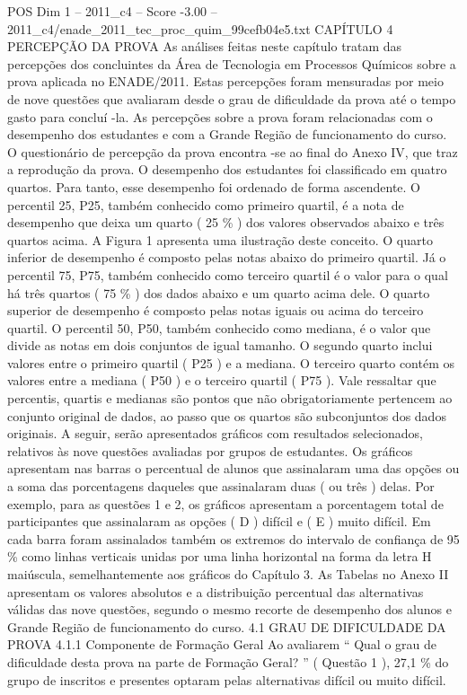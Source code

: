 \begin{textsample}{POS Dim 1 – 2011\_c4 – Score -3.00 – 2011\_c4/enade\_2011\_tec\_proc\_quim\_99cefb04e5.txt}  \label{ex:f1_pos_329}
CAPÍTULO 4 PERCEPÇÃO DA PROVA As análises feitas neste capítulo tratam das percepções dos concluintes da Área de Tecnologia em Processos Químicos sobre a prova aplicada no ENADE/2011.
Estas percepções foram mensuradas por meio de nove questões que avaliaram desde o grau de dificuldade da prova até o tempo gasto para concluí -la.
As percepções sobre a prova foram relacionadas com o desempenho dos estudantes e com a Grande Região de funcionamento do curso.
O questionário de percepção da prova encontra -se ao final do Anexo IV, que traz a reprodução da prova.
O desempenho dos estudantes foi classificado em quatro quartos.
Para tanto, esse desempenho foi ordenado de forma ascendente.
O percentil 25, P25, também conhecido como primeiro quartil, é a nota de desempenho que deixa um quarto ( 25 \% ) dos valores observados abaixo e três quartos acima.
A Figura 1 apresenta uma ilustração deste conceito.
O quarto inferior de desempenho é composto pelas notas abaixo do primeiro quartil.
Já o percentil 75, P75, também conhecido como terceiro quartil é o valor para o qual há três quartos ( 75 \% ) dos dados abaixo e um quarto acima dele.
O quarto superior de desempenho é composto pelas notas iguais ou acima do terceiro quartil.
O percentil 50, P50, também conhecido como mediana, é o valor que divide as notas em dois conjuntos de igual tamanho.
O segundo quarto inclui valores entre o primeiro quartil ( P25 ) e a mediana.
O terceiro quarto contém os valores entre a mediana ( P50 ) e o terceiro quartil ( P75 ).
Vale ressaltar que percentis, quartis e medianas são pontos que não obrigatoriamente pertencem ao conjunto original de dados, ao passo que os quartos são subconjuntos dos dados originais.
A seguir, serão apresentados gráficos com resultados selecionados, relativos às nove questões avaliadas por grupos de estudantes.
Os gráficos apresentam nas barras o percentual de alunos que assinalaram uma das opções ou a soma das porcentagens daqueles que assinalaram duas ( ou três ) delas.
Por exemplo, para as questões 1 e 2, os gráficos apresentam a porcentagem total de participantes que assinalaram as opções ( D ) difícil e ( E ) muito difícil.
Em cada barra foram assinalados também os extremos do intervalo de confiança de 95 \% como linhas verticais unidas por uma linha horizontal na forma da letra H maiúscula, semelhantemente aos gráficos do Capítulo 3.
As Tabelas no Anexo II apresentam os valores absolutos e a distribuição percentual das alternativas válidas das nove questões, segundo o mesmo recorte de desempenho dos alunos e Grande Região de funcionamento do curso. 4.1 GRAU DE DIFICULDADE DA PROVA 4.1.1 Componente de Formação Geral Ao avaliarem “ Qual o grau de dificuldade desta prova na parte de Formação Geral? ” ( Questão 1 ), 27,1 \% do grupo de inscritos e presentes optaram pelas alternativas difícil ou muito difícil.

\end{textsample}

